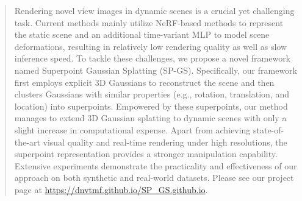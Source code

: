 \begin{abstract}
    Rendering novel view images in dynamic scenes is a crucial yet challenging task. 
    Current methods mainly utilize NeRF-based methods to represent the static scene and an additional time-variant MLP to model scene deformations, resulting in relatively low rendering quality as well as slow inference speed. 
    To tackle these challenges, we propose a novel framework named Superpoint Gaussian Splatting (SP-GS). 
    Specifically, our framework first employs explicit 3D Gaussians to reconstruct the scene and then clusters Gaussians with similar properties (e.g., rotation, translation, and location) into superpoints. Empowered by these superpoints, our method manages to extend 3D Gaussian splatting to dynamic scenes with only a slight increase in computational expense. 
    Apart from achieving state-of-the-art visual quality and real-time rendering under high resolutions, the superpoint representation provides a stronger manipulation capability.
    Extensive experiments demonstrate the practicality and effectiveness of our approach on both synthetic and real-world datasets. Please see our project page at \url{https://dnvtmf.github.io/SP_GS.github.io}.
\end{abstract}